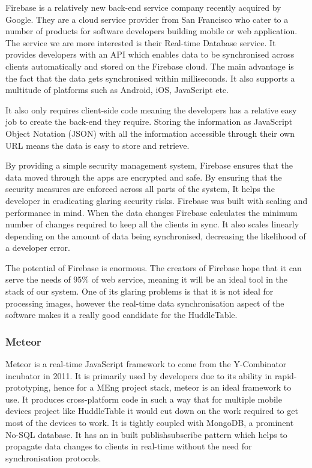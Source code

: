 Firebase\cite{firebase} is a relatively new back-end service
company recently acquired by Google. They are a cloud service provider
from San Francisco who cater to a number of products for software developers
building mobile or web application. The service we are more interested
is their Real-time Database service. It provides developers with an
API which enables data to be synchronised across clients automatically
and stored on the Firebase cloud. The main advantage is the fact that
the data gets synchronised within milliseconds. It also supports a
multitude of platforms such as Android, iOS, JavaScript etc.
 
It also only requires client-side code meaning the developers has
a relative easy job to create the back-end they require. Storing
the information as JavaScript Object Notation (JSON) with all the information accessible through
their own URL means the data is easy to store and retrieve.
 
By providing a simple security management system, Firebase ensures
that the data moved through the apps are encrypted and safe. By ensuring
that the security measures are enforced across all parts of the system,
It helps the developer in eradicating glaring security risks. Firebase was
built with scaling and performance in mind. When the data changes
Firebase calculates the minimum number of changes required to keep
all the clients in sync. It also scales linearly depending on the
amount of data being synchronised, decreasing the likelihood of a
developer error.
 
The potential of Firebase is enormous. The creators of Firebase hope
that it can serve the needs of 95\% of web service\cite{firebase-wired},
meaning it will be an ideal tool in the stack of our system. One of
its glaring problems is that it is not ideal for processing images,
however the real-time data synchronisation aspect of the software makes it a
really good candidate for the HuddleTable.
 
 
\subsubsection{Meteor}
 
Meteor\cite{meteor} is a real-time JavaScript framework to come from
the Y-Combinator incubator in 2011. It is primarily used by developers
due to its ability in rapid-prototyping, hence for a MEng project
stack, meteor is an ideal framework to use. It produces cross-platform
code in such a way that for multiple mobile devices project like HuddleTable
it would cut down on the work required to get most of the devices
to work. It is tightly coupled with MongoDB, a prominent No-SQL
database. It has an in built publish\textendash subscribe pattern\cite{pub-sub-pattern}
which helps to propagate data changes to clients in real-time without
the need for synchronisation protocols.
 
